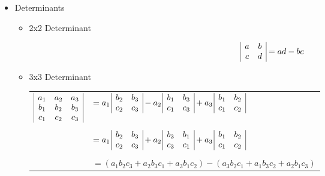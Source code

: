     \begin{itemize}
    \item Determinants
      \begin{itemize}
      \item 2x2 Determinant
      
      \[
\begin{array}{|c c|}
a & b \\
c & d \\
\end{array}
      = ad - bc
      \]
      
      \item 3x3 Determinant

\begin{center}\begin{tabular}{rl}
  $
    \begin{array}{|c c c|}
    a_1 & a_2 & a_3 \\
    b_1 & b_2 & b_3 \\
    c_1 & c_2 & c_3 \\
    \end{array}
  $
  &
  $
      = a_1 \,
    \begin{array}{|c c|}
    b_2 & b_3 \\
    c_2 & c_3 \\
    \end{array}
      - a_2 \,
    \begin{array}{|c c|}
    b_1 & b_3 \\
    c_1 & c_3 \\
    \end{array}
      + a_3 \,
    \begin{array}{|c c|}
    b_1 & b_2 \\
    c_1 & c_2 \\
    \end{array}
  $
  \\ [1ex] \\ &
  $
     = a_1 \,
    \begin{array}{|c c|}
    b_2 & b_3 \\
    c_2 & c_3 \\
    \end{array}
      + a_2 \,
    \begin{array}{|c c|}
    b_3 & b_1 \\
    c_3 & c_1 \\
    \end{array}
      + a_3 \,
    \begin{array}{|c c|}
    b_1 & b_2 \\
    c_1 & c_2 \\
    \end{array}
  $
  \\ [1ex] \\ &
  $= (a_1b_2c_3 + a_2b_3c_1 + a_3b_1c_2) - (a_3b_2c_1 + a_1b_3c_2 + a_2b_1c_3)$
\end{tabular}\end{center}
      

\end{itemize}
\end{itemize}
